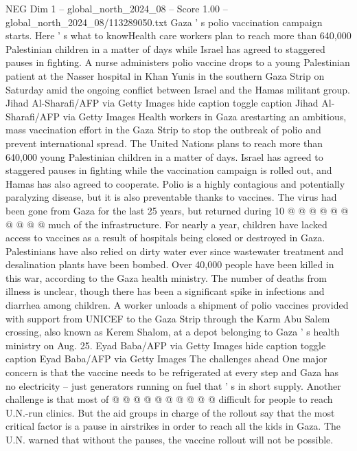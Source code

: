 \begin{textsample}{NEG Dim 1 – global\_north\_2024\_08 – Score 1.00 – global\_north\_2024\_08/113289050.txt}  \label{ex:f1_neg_381}
Gaza ' s polio vaccination campaign starts.
Here ' s what to knowHealth care workers plan to reach more than 640,000 Palestinian children in a matter of days while Israel has agreed to staggered pauses in fighting.
A nurse administers polio vaccine drops to a young Palestinian patient at the Nasser hospital in Khan Yunis in the southern Gaza Strip on Saturday amid the ongoing conflict between Israel and the Hamas militant group.
Jihad Al-Sharafi/AFP via Getty Images hide caption toggle caption Jihad Al-Sharafi/AFP via Getty Images Health workers in Gaza arestarting an ambitious, mass vaccination effort in the Gaza Strip to stop the outbreak of polio and prevent international spread.
The United Nations plans to reach more than 640,000 young Palestinian children in a matter of days.
Israel has agreed to staggered pauses in fighting while the vaccination campaign is rolled out, and Hamas has also agreed to cooperate.
Polio is a highly contagious and potentially paralyzing disease, but it is also preventable thanks to vaccines.
The virus had been gone from Gaza for the last 25 years, but returned during 10 @ @ @ @ @ @ @ @ @ @ much of the infrastructure.
For nearly a year, children have lacked access to vaccines as a result of hospitals being closed or destroyed in Gaza.
Palestinians have also relied on dirty water ever since wastewater treatment and desalination plants have been bombed.
Over 40,000 people have been killed in this war, according to the Gaza health ministry.
The number of deaths from illness is unclear, though there has been a significant spike in infections and diarrhea among children.
A worker unloads a shipment of polio vaccines provided with support from UNICEF to the Gaza Strip through the Karm Abu Salem crossing, also known as Kerem Shalom, at a depot belonging to Gaza ' s health ministry on Aug. 25.
Eyad Baba/AFP via Getty Images hide caption toggle caption Eyad Baba/AFP via Getty Images The challenges ahead One major concern is that the vaccine needs to be refrigerated at every step and Gaza has no electricity -- just generators running on fuel that ' s in short supply.
Another challenge is that most of @ @ @ @ @ @ @ @ @ @ difficult for people to reach U.N.-run clinics.
But the aid groups in charge of the rollout say that the most critical factor is a pause in airstrikes in order to reach all the kids in Gaza.
The U.N. warned that without the pauses, the vaccine rollout will not be possible.

\end{textsample}
